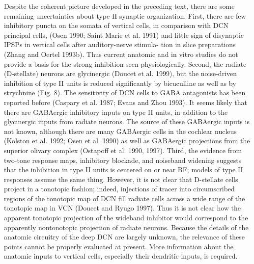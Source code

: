 {Despite the coherent picture developed in the preceding text,
there are some remaining uncertainties about type II synaptic
organization. First, there are few inhibitory puncta on the
somata of vertical cells, in comparison with DCN principal
cells, (Osen 1990; Saint Marie et al. 1991) and little sign of
disynaptic IPSPs in vertical cells after auditory-nerve stimula-
tion in slice preparations (Zhang and Oertel 1993b). Thus
current anatomic and in vitro studies do not provide a basis for
the strong inhibition seen physiologically. Second, the radiate
(D-stellate) neurons are glycinergic (Doucet et al. 1999), but the
noise-driven inhibition of type II units is reduced signiﬁcantly
by bicuculline as well as by strychnine (Fig. 8). The sensitivity
of DCN cells to GABA antagonists has been reported before
(Caspary et al. 1987; Evans and Zhou 1993). It seems likely
that there are GABAergic inhibitory inputs on type II units, in
addition to the glycinergic inputs from radiate neurons. The
source of these GABAergic inputs is not known, although there
are many GABAergic cells in the cochlear nucleus (Kolston et
al. 1992; Osen et al. 1990) as well as GABAergic projections
from the superior olivary complex (Ostapoff et al. 1990, 1997).
Third, the evidence from two-tone response maps, inhibitory
blockade, and noiseband widening suggests that the inhibition
in type II units is centered on or near BF; models of type II
responses assume the same thing. However, it is not clear that
D-stellate cells project in a tonotopic fashion; indeed, injections
of tracer into circumscribed regions of the tonotopic map of
DCN ﬁll radiate cells across a wide range of the tonotopic map
in VCN (Doucet and Ryugo 1997). Thus it is not clear how the
apparent tonotopic projection of the wideband inhibitor would
correspond to the apparently nontonotopic projection of radiate
neurons. Because the details of the anatomic circuitry of the
deep DCN are largely unknown, the relevance of these points
cannot be properly evaluated at present. More information
about the anatomic inputs to vertical cells, especially their
dendritic inputs, is required.

}
